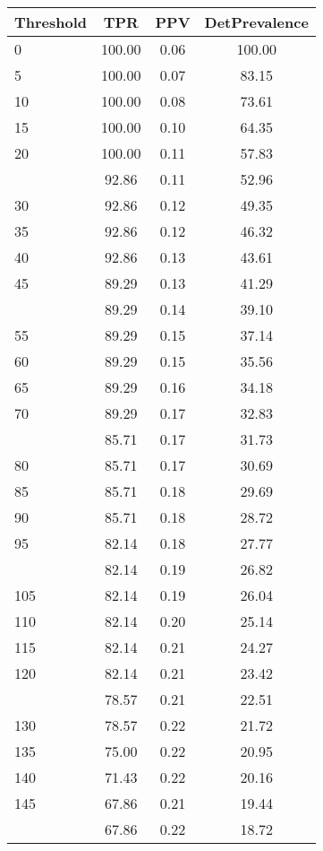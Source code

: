 \begin{table}[ht]
\centering
\begin{tabular}{lccc}
  \toprule
Threshold & TPR & PPV & DetPrevalence \\ 
  \midrule
0 & 100.00 & 0.06 & 100.00 \\ 
  5 & 100.00 & 0.07 & 83.15 \\ 
  10 & 100.00 & 0.08 & 73.61 \\ 
  15 & 100.00 & 0.10 & 64.35 \\ 
  20 & 100.00 & 0.11 & 57.83 \\ 
   \addlinespace
25 & 92.86 & 0.11 & 52.96 \\ 
  30 & 92.86 & 0.12 & 49.35 \\ 
  35 & 92.86 & 0.12 & 46.32 \\ 
  40 & 92.86 & 0.13 & 43.61 \\ 
  45 & 89.29 & 0.13 & 41.29 \\ 
   \addlinespace
50 & 89.29 & 0.14 & 39.10 \\ 
  55 & 89.29 & 0.15 & 37.14 \\ 
  60 & 89.29 & 0.15 & 35.56 \\ 
  65 & 89.29 & 0.16 & 34.18 \\ 
  70 & 89.29 & 0.17 & 32.83 \\ 
   \addlinespace
75 & 85.71 & 0.17 & 31.73 \\ 
  80 & 85.71 & 0.17 & 30.69 \\ 
  85 & 85.71 & 0.18 & 29.69 \\ 
  90 & 85.71 & 0.18 & 28.72 \\ 
  95 & 82.14 & 0.18 & 27.77 \\ 
   \addlinespace
100 & 82.14 & 0.19 & 26.82 \\ 
  105 & 82.14 & 0.19 & 26.04 \\ 
  110 & 82.14 & 0.20 & 25.14 \\ 
  115 & 82.14 & 0.21 & 24.27 \\ 
  120 & 82.14 & 0.21 & 23.42 \\ 
   \addlinespace
125 & 78.57 & 0.21 & 22.51 \\ 
  130 & 78.57 & 0.22 & 21.72 \\ 
  135 & 75.00 & 0.22 & 20.95 \\ 
  140 & 71.43 & 0.22 & 20.16 \\ 
  145 & 67.86 & 0.21 & 19.44 \\ 
   \addlinespace
150 & 67.86 & 0.22 & 18.72 \\ 

\end{tabular}
\end{table}
